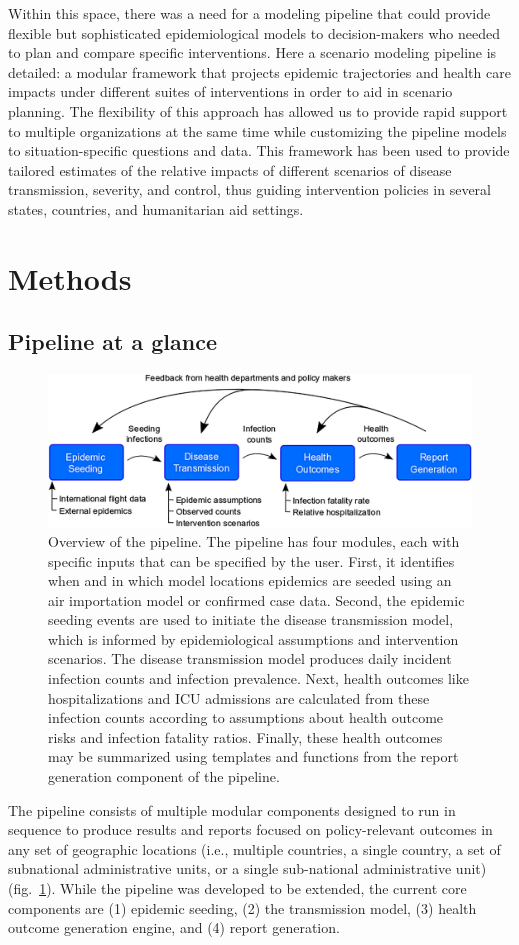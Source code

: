 Within this space, there was a need for a modeling pipeline that could provide flexible but sophisticated epidemiological models to decision-makers who needed to plan and compare specific interventions. Here a scenario modeling pipeline is detailed: a modular framework that projects epidemic trajectories and health care impacts under different suites of interventions in order to aid in scenario planning. The flexibility of this approach has allowed us to provide rapid support to multiple organizations at the same time while customizing the pipeline models to situation-specific questions and data. This framework has been used to provide tailored estimates of the relative impacts of different scenarios of disease transmission, severity, and control, thus guiding intervention policies in several states, countries, and humanitarian aid settings.

\section{Methods}
\subsection{Pipeline at a glance}
\begin{figure}[!htb]
    \centering
    \includegraphics[width = .8\textwidth]{fig_pipeline/fig1a}
    \caption[Overview of the pipeline]{Overview of the pipeline. The pipeline has four modules, each with specific inputs that can be specified by the user. First, it identifies when and in which model locations epidemics are seeded using an air importation model or confirmed case data. Second, the epidemic seeding events are used to initiate the disease transmission model, which is informed by epidemiological assumptions and intervention scenarios. The disease transmission model produces daily incident infection counts and infection prevalence. Next, health outcomes like hospitalizations and ICU admissions are calculated from these infection counts according to assumptions about health outcome risks and infection fatality ratios. Finally, these health outcomes may be summarized using templates and functions from the report generation component of the pipeline.}
    \label{fig:pipeline-modules}
\end{figure}
The pipeline consists of multiple modular components designed to run in sequence to produce results and reports focused on policy-relevant outcomes in any set of geographic locations (i.e., multiple countries, a single country, a set of subnational administrative units, or a single sub-national administrative unit) (fig.~\ref{fig:pipeline-modules}). While the pipeline was developed to be extended, the current core components are (1) epidemic seeding, (2) the transmission model, (3) health outcome generation engine, and (4) report generation. 

